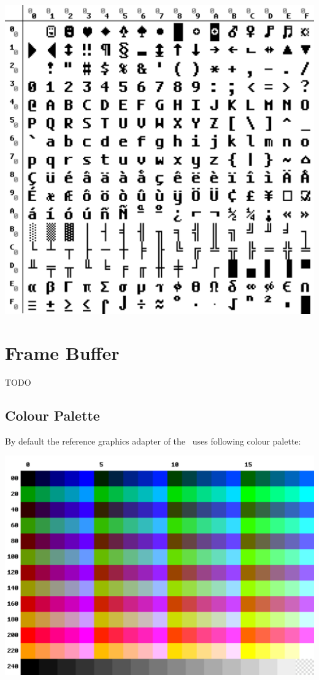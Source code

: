 {\centering
\includegraphics[width=\linewidth]{tsvmcp.png}
\label{fig:codepage}
}
\newpage


\section{Frame Buffer}

TODO

\subsection{Colour Palette}
\label{colourpalette}

By default the reference graphics adapter of the \thismachine\ uses following colour palette:

{\centering
\includegraphics[width=\linewidth]{tsvmpal.png}
\label{fig:colourpalette}
}

